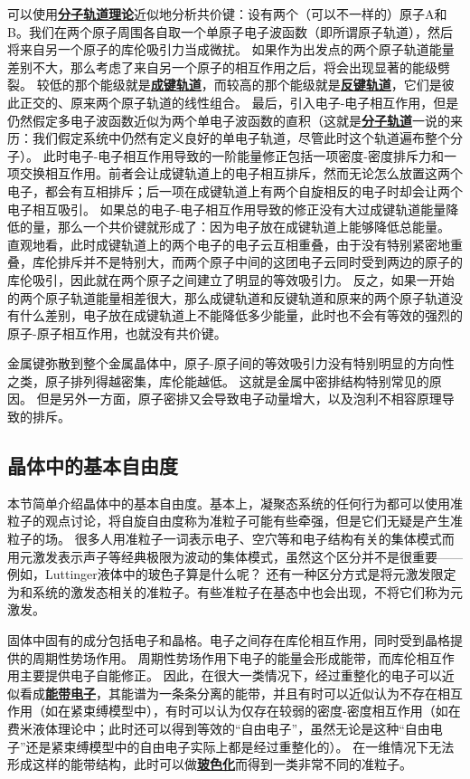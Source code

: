 \documentclass[hyperref, UTF8, a4paper]{ctexart}
\newcommand*{\concept}[1]{\underline{\textbf{#1}}}
\begin{document}
可以使用\concept{分子轨道理论}近似地分析共价键：设有两个（可以不一样的）原子A和B。我们在两个原子周围各自取一个单原子电子波函数（即所谓原子轨道），然后将来自另一个原子的库伦吸引力当成微扰。
如果作为出发点的两个原子轨道能量差别不大，那么考虑了来自另一个原子的相互作用之后，将会出现显著的能级劈裂。
较低的那个能级就是\concept{成键轨道}，而较高的那个能级就是\concept{反键轨道}，它们是彼此正交的、原来两个原子轨道的线性组合。
最后，引入电子-电子相互作用，但是仍然假定多电子波函数近似为两个单电子波函数的直积（这就是\concept{分子轨道}一说的来历：我们假定系统中仍然有定义良好的单电子轨道，尽管此时这个轨道遍布整个分子）。
此时电子-电子相互作用导致的一阶能量修正包括一项密度-密度排斥力和一项交换相互作用。前者会让成键轨道上的电子相互排斥，然而无论怎么放置这两个电子，都会有互相排斥；后一项在成键轨道上有两个自旋相反的电子时却会让两个电子相互吸引。
如果总的电子-电子相互作用导致的修正没有大过成键轨道能量降低的量，那么一个共价键就形成了：因为电子放在成键轨道上能够降低总能量。
直观地看，此时成键轨道上的两个电子的电子云互相重叠，由于没有特别紧密地重叠，库伦排斥并不是特别大，而两个原子中间的这团电子云同时受到两边的原子的库伦吸引，因此就在两个原子之间建立了明显的等效吸引力。
反之，如果一开始的两个原子轨道能量相差很大，那么成键轨道和反键轨道和原来的两个原子轨道没有什么差别，电子放在成键轨道上不能降低多少能量，此时也不会有等效的强烈的原子-原子相互作用，也就没有共价键。

金属键弥散到整个金属晶体中，原子-原子间的等效吸引力没有特别明显的方向性之类，原子排列得越密集，库伦能越低。
这就是金属中密排结构特别常见的原因。
但是另外一方面，原子密排又会导致电子动量增大，以及泡利不相容原理导致的排斥。

\subsection{晶体中的基本自由度}

本节简单介绍晶体中的基本自由度。基本上，凝聚态系统的任何行为都可以使用准粒子的观点讨论，将自旋自由度称为准粒子可能有些牵强，但是它们无疑是产生准粒子的场。
很多人用准粒子一词表示电子、空穴等和电子结构有关的集体模式而用元激发表示声子等经典极限为波动的集体模式，虽然这个区分并不是很重要——例如，Luttinger液体中的玻色子算是什么呢？
还有一种区分方式是将元激发限定为和系统的激发态相关的准粒子。有些准粒子在基态中也会出现，不将它们称为元激发。

固体中固有的成分包括电子和晶格。电子之间存在库伦相互作用，同时受到晶格提供的周期性势场作用。
周期性势场作用下电子的能量会形成能带，而库伦相互作用主要提供电子自能修正。
因此，在很大一类情况下，经过重整化的电子可以近似看成\concept{能带电子}，其能谱为一条条分离的能带，并且有时可以近似认为不存在相互作用（如在紧束缚模型中），有时可以认为仅存在较弱的密度-密度相互作用（如在费米液体理论中；此时还可以得到等效的“自由电子”，虽然无论是这种“自由电子”还是紧束缚模型中的自由电子实际上都是经过重整化的）。
在一维情况下无法形成这样的能带结构，此时可以做\concept{玻色化}而得到一类非常不同的准粒子。
\end{document}
